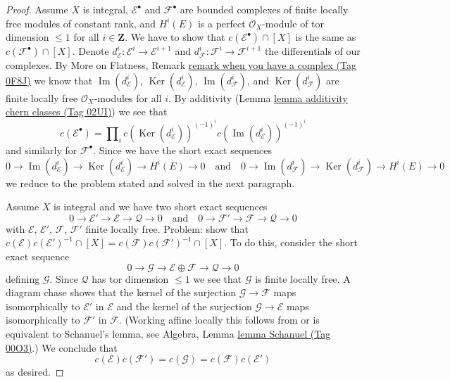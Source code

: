 \documentclass{amsart}
\theoremstyle{plain}
\theoremstyle{definition}
\theoremstyle{remark}
\numberwithin{equation}{subsection}
\def\Ker{\mathop{\mathrm{Ker}}}
\def\Im{\mathop{\mathrm{Im}}}
\begin{document}
\begin{proof}
\medskip\noindent
Assume $X$ is integral, $\mathcal{E}^\bullet$ and $\mathcal{F}^\bullet$
are bounded complexes of finite locally free modules of constant rank, and
$H^i(E)$ is a perfect $\mathcal{O}_X$-module of tor dimension $\leq 1$
for all $i \in \mathbf{Z}$. We have to
show that $c(\mathcal{E}^\bullet) \cap [X]$ is the same as
$c(\mathcal{F}^\bullet) \cap [X]$. Denote
$d_\mathcal{E}^i : \mathcal{E}^i \to \mathcal{E}^{i + 1}$ and
$d_\mathcal{F}^i : \mathcal{F}^i \to \mathcal{F}^{i + 1}$
the differentials of our complexes. By
More on Flatness, Remark \href{https://stacks.math.columbia.edu/tag/0F8J}{remark when you have a complex (Tag 0F8J)}
we know that $\Im(d_\mathcal{E}^i)$, $\Ker(d_\mathcal{E}^i)$,
$\Im(d_\mathcal{F}^i)$, and $\Ker(d_\mathcal{F}^i)$
are finite locally free $\mathcal{O}_X$-modules for all $i$.
By additivity (Lemma \href{https://stacks.math.columbia.edu/tag/02UI}{lemma additivity chern classes (Tag 02UI)}) we see that
$$
c(\mathcal{E}^\bullet) = \prod\nolimits_i
c(\Ker(d_\mathcal{E}^i))^{(-1)^i} c(\Im(d_\mathcal{E}^i))^{(-1)^i}
$$
and similarly for $\mathcal{F}^\bullet$. Since we have the
short exact sequences
$$
0 \to \Im(d_\mathcal{E}^i) \to \Ker(d_\mathcal{E}^i) \to H^i(E) \to 0
\quad\text{and}\quad
0 \to \Im(d_\mathcal{F}^i) \to \Ker(d_\mathcal{F}^i) \to H^i(E) \to 0
$$
we reduce to the problem stated and solved in the next paragraph.

\medskip\noindent
Assume $X$ is integral and we have two short exact sequences
$$
0 \to \mathcal{E}' \to \mathcal{E} \to \mathcal{Q} \to 0
\quad\text{and}\quad
0 \to \mathcal{F}' \to \mathcal{F} \to \mathcal{Q} \to 0
$$
with $\mathcal{E}$, $\mathcal{E}'$, $\mathcal{F}$, $\mathcal{F}'$
finite locally free. Problem: show that
$c(\mathcal{E})c(\mathcal{E}')^{-1} \cap [X] =
c(\mathcal{F})c(\mathcal{F}')^{-1} \cap [X]$.
To do this, consider the short exact sequence
$$
0 \to \mathcal{G} \to \mathcal{E} \oplus \mathcal{F} \to \mathcal{Q} \to 0
$$
defining $\mathcal{G}$. Since $\mathcal{Q}$ has tor dimension $\leq 1$
we see that $\mathcal{G}$ is finite locally free. A diagram chase
shows that the kernel of the surjection $\mathcal{G} \to \mathcal{F}$
maps isomorphically to $\mathcal{E}'$ in $\mathcal{E}$ and
the kernel of the surjection $\mathcal{G} \to \mathcal{E}$ maps
isomorphically to $\mathcal{F}'$ in $\mathcal{F}$. (Working affine
locally this follows from or is equivalent to Schanuel's lemma, see
Algebra, Lemma \href{https://stacks.math.columbia.edu/tag/00O3}{lemma Schanuel (Tag 00O3)}.)
We conclude that
$$
c(\mathcal{E})c(\mathcal{F}') = c(\mathcal{G}) =
c(\mathcal{F})c(\mathcal{E}')
$$
as desired.
\end{proof}
\end{document}
